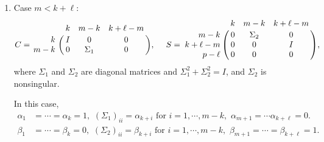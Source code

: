 \begin{itemize}
\begin{enumerate}[\hspace{2em}(1)]
\item Case $m < k+\ell$: 
\[
                    C = \bordermatrix{ & k & m-k & k+\ell-m  \cr
                    \hfill k & I & 0 & 0\cr
                    \hfill m-k & 0 & \Sigma_1 & 0}, \  \ \ \
                    S = \bordermatrix{ & k & m-k & k+\ell-m \cr
                    \hfill m-k & 0 & \Sigma_2 & 0\cr
                    \hfill k+\ell-m & 0 & 0 & I\cr
                    \hfill p-\ell & 0 & 0 & 0}, 
\]
where $\Sigma_1$ and $\Sigma_2$ are diagonal matrices 
and $\Sigma_1^2 + \Sigma_2^2 = I$, and $\Sigma_2$ is nonsingular. 

In this case, 
\begin{align*} 
\alpha_1 & =  \cdots = \alpha_k = 1, \,\,  
(\Sigma_1)_{ii} = \alpha_{k+i}\,\, \mbox{for $i = 1, \cdots, m-k$},\,\,
\alpha_{m+1} = \cdots \alpha_{k+\ell} = 0. \\
\beta_1 & = \cdots = \beta_k = 0, \,\,  
(\Sigma_2)_{ii} = \beta_{k+i}\,\, \mbox{for $i = 1, \cdots, m-k$}, \,\,  
\beta_{m+1} = \cdots = \beta_{k+\ell} = 1.
\end{align*} 


\end{enumerate}

\end{itemize}

